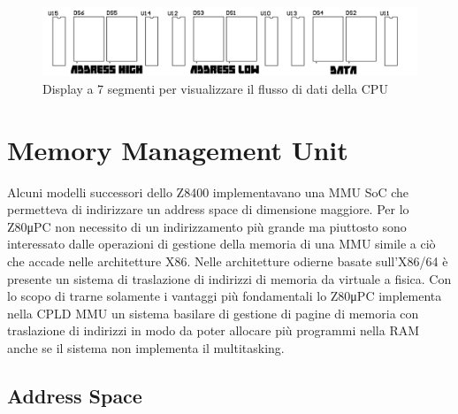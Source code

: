 \documentclass[a4paper, 11pt, twoside]{article}
\newcommand{\prj}{Z80μPC\xspace}
\begin{document}
\begin{figure}[!h] \centering
    \includegraphics[width=\linewidth]{res/bus_displays}
    \caption{Display a 7 segmenti per visualizzare il flusso di dati della
    CPU}
\end{figure}

\section{Memory Management Unit}

Alcuni modelli successori dello Z8400 implementavano una MMU SoC che
permetteva di indirizzare un address space di dimensione maggiore. Per lo \prj
non necessito di un indirizzamento pi\`u grande ma piuttosto sono interessato
dalle operazioni di gestione della memoria di una MMU simile a ci\`o che
accade nelle architetture X86. Nelle architetture odierne basate sull'X86/64
\`e presente un sistema di traslazione di indirizzi di memoria da virtuale a
fisica. Con lo scopo di trarne solamente i vantaggi pi\`u fondamentali lo \prj
implementa nella CPLD MMU un sistema basilare di gestione di pagine di memoria
con traslazione di indirizzi in modo da poter allocare pi\`u programmi nella
RAM anche se il sistema non implementa il multitasking.


\subsection{Address Space}
\end{document}
